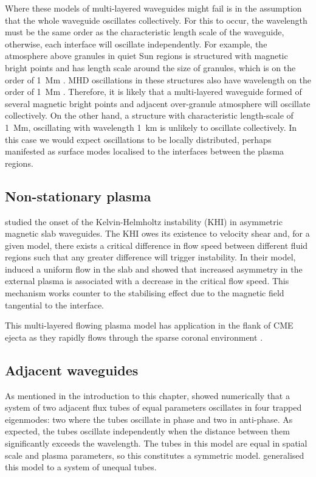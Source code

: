 Where these models of multi-layered waveguides might fail is in the assumption that the whole waveguide oscillates collectively. For this to occur, the wavelength must be the same order as the characteristic length scale of the waveguide, otherwise, each interface will oscillate independently. For example, the atmosphere above granules in quiet Sun regions is structured with magnetic bright points and has length scale around the size of granules, which is on the order of 1~Mm \citep{ras03}. MHD oscillations in these structures also have wavelength on the order of 1~Mm \citep{jaf_etal17}. Therefore, it is likely that a multi-layered waveguide formed of several magnetic bright points and adjacent over-granule atmosphere will oscillate collectively. On the other hand, a structure with characteristic length-scale of 1~Mm, oscillating with wavelength 1~km is unlikely to oscillate collectively. In this case we would expect oscillations to be locally distributed, perhaps manifested as surface modes localised to the interfaces between the plasma regions.


\subsection{Non-stationary plasma}
\cite{bar_etal18} studied the onset of the Kelvin-Helmholtz instability (KHI) in asymmetric magnetic slab waveguides. The KHI owes its existence to velocity shear and, for a given model, there exists a critical difference in flow speed between different fluid regions such that any greater difference will trigger instability. In their model, \cite{bar_etal18} induced a uniform flow in the slab and showed that increased asymmetry in the external plasma is associated with a decrease in the critical flow speed. This mechanism works counter to the stabilising effect due to the magnetic field tangential to the interface.

This multi-layered flowing plasma model has application in the flank of CME ejecta as they rapidly flows through the sparse coronal environment \citep{fou_etal11}.


\subsection{Adjacent waveguides}
As mentioned in the introduction to this chapter, \cite{lun_etal08} showed numerically that a system of two adjacent flux tubes of equal parameters oscillates in four trapped eigenmodes: two where the tubes oscillate in phase and two in anti-phase. As expected, the tubes oscillate independently when the distance between them significantly exceeds the wavelength. The tubes in this model are equal in spatial scale and plasma parameters, so this constitutes a symmetric model. \cite{van_etal08} generalised this model to a system of unequal tubes.

